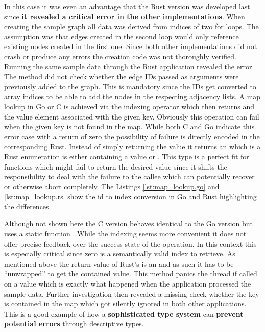 In this case it was even an advantage that the Rust version was developed last since \textbf{it revealed a critical error in the other implementations}. When creating the sample graph all data was derived from indices of two for loops. The assumption was that edges created in the second loop would only reference existing nodes created in the first one. Since both other implementations did not crash or produce any errors the creation code was not thoroughly verified. Running the same sample data through the Rust application revealed the error. The  method did not check whether the edge IDs passed as arguments were previously added to the graph. This is mandatory since the IDs get converted to array indices to be able to add the nodes in the respecting adjacency lists. A map lookup in Go or C is achieved via the indexing operator which then returns and the value element associated with the given key. Obviously this operation can fail when the given key is not found in the map. While both C and Go indicate this error case with a return of zero the possibility of failure is directly encoded in the corresponding Rust. Instead of simply returning the value it returns an  which is a Rust enumeration is either containing a value or . This type is a perfect fit for functions which might fail to return the desired value since it shifts the responsibility to deal with the failure to the callee which can potentially recover or otherwise abort completely. The Listings \ref{lst:map_lookup.go} and \ref{lst:map_lookup.rs} show the id to index conversion in Go and Rust highlighting the differences.
\\

\newpage


Although not shown here the C version behaves identical to the Go version but uses a static function . While the indexing seems more convenient it does not offer precise feedback over the success state of the operation. In this context this is especially critical since zero is a semantically valid index to retrieve. As mentioned above the return value of Rust's  is an  and as such it has to be ``unwrapped'' to get the contained value. This method panics the thread if called on a  value which is exactly what happened when the application processed the sample data. Further investigation then revealed a missing check whether the key is contained in the map which got silently ignored in both other applications. This is a good example of how a \textbf{sophisticated type system} can \textbf{prevent potential errors} through descriptive types.

